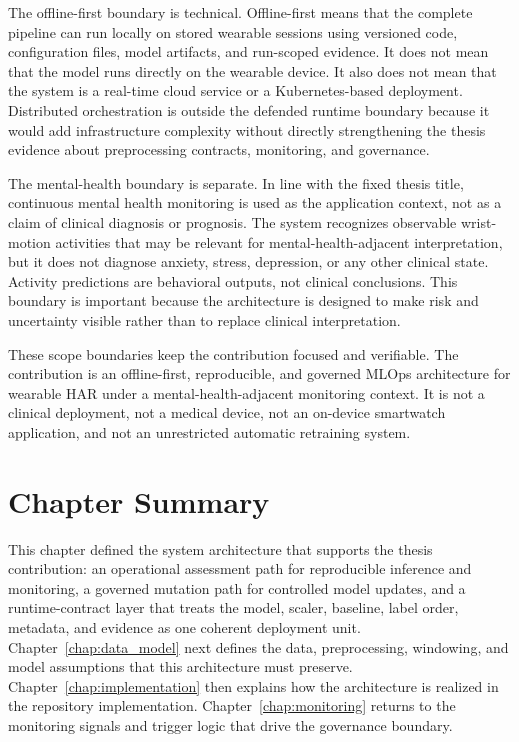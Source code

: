 The offline-first boundary is technical. Offline-first means that the complete pipeline can run locally on stored wearable sessions using versioned code, configuration files, model artifacts, and run-scoped evidence. It does not mean that the model runs directly on the wearable device. It also does not mean that the system is a real-time cloud service or a Kubernetes-based deployment. Distributed orchestration is outside the defended runtime boundary because it would add infrastructure complexity without directly strengthening the thesis evidence about preprocessing contracts, monitoring, and governance.

The mental-health boundary is separate. In line with the fixed thesis title, continuous mental health monitoring is used as the application context, not as a claim of clinical diagnosis or prognosis. The system recognizes observable wrist-motion activities that may be relevant for mental-health-adjacent interpretation, but it does not diagnose anxiety, stress, depression, or any other clinical state. Activity predictions are behavioral outputs, not clinical conclusions. This boundary is important because the architecture is designed to make risk and uncertainty visible rather than to replace clinical interpretation.

These scope boundaries keep the contribution focused and verifiable. The contribution is an offline-first, reproducible, and governed MLOps architecture for wearable HAR under a mental-health-adjacent monitoring context. It is not a clinical deployment, not a medical device, not an on-device smartwatch application, and not an unrestricted automatic retraining system.

\section{Chapter Summary}
\label{sec:chapter3_summary}

This chapter defined the system architecture that supports the thesis contribution: an operational assessment path for reproducible inference and monitoring, a governed mutation path for controlled model updates, and a runtime-contract layer that treats the model, scaler, baseline, label order, metadata, and evidence as one coherent deployment unit. Chapter~\ref{chap:data_model} next defines the data, preprocessing, windowing, and model assumptions that this architecture must preserve. Chapter~\ref{chap:implementation} then explains how the architecture is realized in the repository implementation. Chapter~\ref{chap:monitoring} returns to the monitoring signals and trigger logic that drive the governance boundary.

